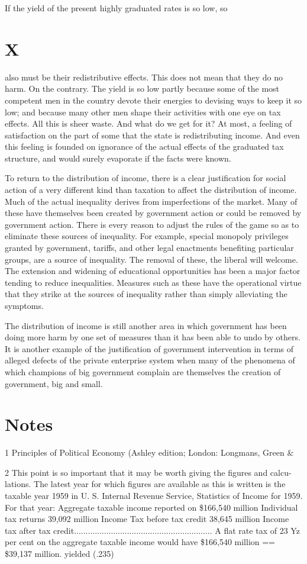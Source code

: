 \documentclass[11pt,openany]{book}
\newcommand{\booksection}[1]{%
  \phantomsection\section*{#1}%
  \addcontentsline{toc}{section}{#1}\markright{#1}}
\newcommand{\booknoteshead}{%
  \phantomsection\section*{Notes}%
  \addcontentsline{toc}{section}{Notes}\markright{Notes}}
\begin{document}
If the yield of the present highly graduated rates is so low, so

\booksection{X}

also must be their redistributive effects. This does not mean that they do no harm. On the contrary. The yield is so low partly because some of the most competent men in the country devote their energies to devising ways to keep it so low; and because many other men shape their activities with one eye on tax effects. All this is sheer waste. And what do we get for it? At most, a feeling of satisfaction on the part of some that the state is redistributing income. And even this feeling is founded on ignorance of the actual effects of the graduated tax structure, and would surely evaporate if the facts were known.

To return to the distribution of income, there is a clear justification for social action of a very different kind than taxation to affect the distribution of income. Much of the actual inequality derives from imperfections of the market. Many of these have themselves been created by government action or could be removed by government action. There is every reason to adjust the rules of the game so as to eliminate these sources of inequality. For example, special monopoly privileges granted by government, tariffs, and other legal enactments benefiting particular groups, are a source of inequality. The removal of these, the liberal will welcome. The extension and widening of educational opportunities has been a major factor tending to reduce inequalities. Measures such as these have the operational virtue that they strike at the sources of inequality rather than simply alleviating the symptoms.

The distribution of income is still another area in which government has been doing more harm by one set of measures than it has been able to undo by others. It is another example of the justification of government intervention in terms of alleged defects of the private enterprise system when many of the phenomena of which champions of big government complain are themselves the creation of government, big and small.

\booknoteshead

{\footnotesize\setlength{\parindent}{0pt}\setlength{\parskip}{5pt}

1 Principles of Political Economy (Ashley edition; London: Longmans, Green \&\par

2 This point is so important that it may be worth giving the figures and calcu- lations. The latest year for which figures are available as this is written is the taxable year 1959 in U. S. Internal Revenue Service, Statistics of Income for 1959. For that year: Aggregate taxable income reported on \$166,540 million Individual tax returns 39,092 million Income Tax before tax credit 38,645 million Income tax after tax credit............................................................ A flat rate tax of 23 Yz per cent on the aggregate taxable income would have \$166,540 million == \$39,137 million. yielded (.235)\par

}
\end{document}
